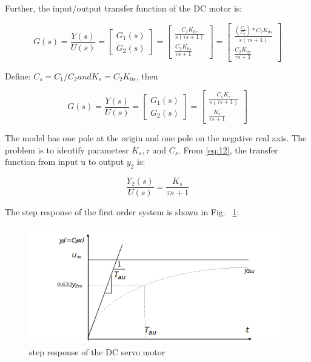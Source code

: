 \documentclass[11pt,a4paper]{article}
\begin{document}
Further, the input/output transfer function of the DC motor is:

\begin{equation} \label{eq:11}
G(s)=\frac{Y(s)}{U(s)} = \left[ \begin{matrix} G_{1}(s) \\ G_{2}(s) \end{matrix} \right] = \left[ \begin{matrix} \frac{C_{1}K_{0x}}{s(\tau s + 1)} \\ \frac{C_{2}K_{0s}}{\tau s + 1} \end{matrix} \right] = \left[ \begin{matrix} \frac{\left(\frac{C_{1}}{C_{2}}\right)*C_{2}K_{0s}}{s(\tau s + 1)} \\ \frac{C_{2}K_{0s}}{\tau s + 1} \end{matrix} \right]
\end{equation}

Define: $C_{s}=C_{1}/C_{2} and K_{s}=C_{2}K_{0s}$, then

\begin{equation} \label{eq:12}
G(s)=\frac{Y(s)}{U(s)} = \left[ \begin{matrix} G_{1}(s) \\ G_{2}(s) \end{matrix} \right] = \left[ \begin{matrix} \frac{C_{s}K_{s}}{s(\tau s + 1)} \\ \frac{K_{s}}{\tau s + 1} \end{matrix} \right]
\end{equation}

The model has one pole at the origin and one pole on the negative real axis. The problem is to identify parametesr $K_{s}, \tau$ and $C_{s}$. From \ref{eq:12}, the transfer function from input u to output $y_{2}$ is:

\begin{equation} \label{eq:13}
\frac{Y_{2}(s)}{U(s)} = \frac{K_{s}}{\tau s + 1}
\end{equation}

The step response of the first order system is shown in Fig. ~\ref{fig:servostepresp}:

\begin{figure}[here]
\includegraphics[width=\textwidth]{imglab/servostepresponse.png}
\caption{step response of the DC servo motor}
\label{fig:servostepresp}
\end{figure}
\end{document}
